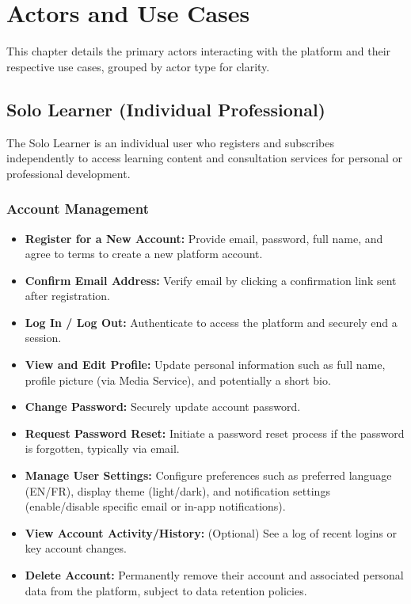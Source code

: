 \documentclass[12pt, a4paper]{report} %
\begin{document}
\chapter{Actors and Use Cases}
This chapter details the primary actors interacting with the platform and their respective use cases, grouped by actor type for clarity.

\section{Solo Learner (Individual Professional)}
The Solo Learner is an individual user who registers and subscribes independently to access learning content and consultation services for personal or professional development.
  \subsection{Account Management}
    \begin{itemize}
        \item \textbf{Register for a New Account:} Provide email, password, full name, and agree to terms to create a new platform account.
        \item \textbf{Confirm Email Address:} Verify email by clicking a confirmation link sent after registration.
        \item \textbf{Log In / Log Out:} Authenticate to access the platform and securely end a session.
        \item \textbf{View and Edit Profile:} Update personal information such as full name, profile picture (via Media Service), and potentially a short bio.
        \item \textbf{Change Password:} Securely update account password.
        \item \textbf{Request Password Reset:} Initiate a password reset process if the password is forgotten, typically via email.
        \item \textbf{Manage User Settings:} Configure preferences such as preferred language (EN/FR), display theme (light/dark), and notification settings (enable/disable specific email or in-app notifications).
        \item \textbf{View Account Activity/History:} (Optional) See a log of recent logins or key account changes.
        \item \textbf{Delete Account:} Permanently remove their account and associated personal data from the platform, subject to data retention policies.
    \end{itemize}
\end{document}
